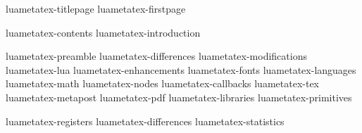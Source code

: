 \component luametatex-titlepage
\component luametatex-firstpage

\startfrontmatter
    \component luametatex-contents
    \component luametatex-introduction
\stopfrontmatter

\startbodymatter
    \component luametatex-preamble
    \component luametatex-differences
    \component luametatex-modifications
    \component luametatex-lua
    \component luametatex-enhancements
    \component luametatex-fonts
    \component luametatex-languages
    \component luametatex-math
    \component luametatex-nodes
    \component luametatex-callbacks
    \component luametatex-tex
    \component luametatex-metapost
    \component luametatex-pdf
    \component luametatex-libraries
    \component luametatex-primitives
\stopbodymatter

\startbackmatter
    \component luametatex-registers
    \component luametatex-differences
    \component luametatex-statistics
\stopbackmatter

\stopdocument

